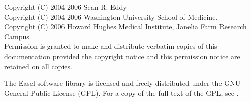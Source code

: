 \vspace*{\fill}
\begin{flushleft}
Copyright (C) 2004-2006 Sean R. Eddy\\
Copyright (C) 2004-2006 Washington University School of Medicine.\\
Copyright (C) 2006 Howard Hughes Medical Institute, Janelia Farm Research Campus.\\

\vspace{1.5em}
Permission is granted to make and distribute verbatim copies of this
documentation provided the copyright notice and this permission notice
are retained on all copies.

\vspace{1.5em}
The Easel software library is licensed and freely distributed under
the GNU General Public License (GPL).  For a copy of the full text of
the GPL, see
.

\vspace{1.5em}
\end{flushleft}


